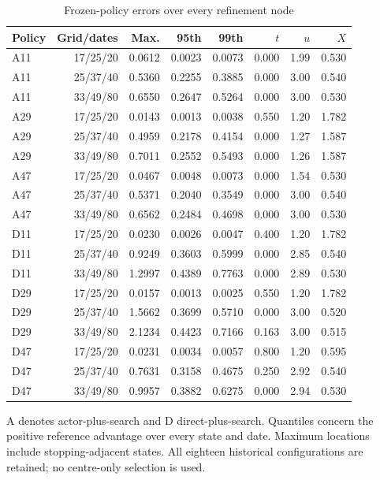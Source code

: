\begin{table}[htbp]
\centering\footnotesize\setlength{\tabcolsep}{4pt}
\caption{Frozen-policy errors over every refinement node}\label{tab:r9full}
\begin{tabular}{lrrrrrrr}
\toprule
Policy & Grid/dates & Max. & 95th & 99th & $t$ & $u$ & $X$ \\
\midrule
A11 & 17/25/20 & 0.0612 & 0.0023 & 0.0073 & 0.000 & 1.99 & 0.530 \\
A11 & 25/37/40 & 0.5360 & 0.2255 & 0.3885 & 0.000 & 3.00 & 0.540 \\
A11 & 33/49/80 & 0.6550 & 0.2647 & 0.5264 & 0.000 & 3.00 & 0.530 \\
A29 & 17/25/20 & 0.0143 & 0.0013 & 0.0038 & 0.550 & 1.20 & 1.782 \\
A29 & 25/37/40 & 0.4959 & 0.2178 & 0.4154 & 0.000 & 1.27 & 1.587 \\
A29 & 33/49/80 & 0.7011 & 0.2552 & 0.5493 & 0.000 & 1.26 & 1.587 \\
A47 & 17/25/20 & 0.0467 & 0.0048 & 0.0073 & 0.000 & 1.54 & 0.530 \\
A47 & 25/37/40 & 0.5371 & 0.2040 & 0.3549 & 0.000 & 3.00 & 0.540 \\
A47 & 33/49/80 & 0.6562 & 0.2484 & 0.4698 & 0.000 & 3.00 & 0.530 \\
D11 & 17/25/20 & 0.0230 & 0.0026 & 0.0047 & 0.400 & 1.20 & 1.782 \\
D11 & 25/37/40 & 0.9249 & 0.3603 & 0.5999 & 0.000 & 2.85 & 0.540 \\
D11 & 33/49/80 & 1.2997 & 0.4389 & 0.7763 & 0.000 & 2.89 & 0.530 \\
D29 & 17/25/20 & 0.0157 & 0.0013 & 0.0025 & 0.550 & 1.20 & 1.782 \\
D29 & 25/37/40 & 1.5662 & 0.3699 & 0.5710 & 0.000 & 3.00 & 0.520 \\
D29 & 33/49/80 & 2.1234 & 0.4423 & 0.7166 & 0.163 & 3.00 & 0.515 \\
D47 & 17/25/20 & 0.0231 & 0.0034 & 0.0057 & 0.800 & 1.20 & 0.595 \\
D47 & 25/37/40 & 0.7631 & 0.3158 & 0.4675 & 0.250 & 2.92 & 0.540 \\
D47 & 33/49/80 & 0.9957 & 0.3882 & 0.6275 & 0.000 & 2.94 & 0.530 \\
\bottomrule
\end{tabular}
\par\vspace{3pt}\begin{minipage}{0.97\linewidth}\footnotesize A denotes actor-plus-search and D direct-plus-search. Quantiles concern the positive reference advantage over every state and date. Maximum locations include stopping-adjacent states. All eighteen historical configurations are retained; no centre-only selection is used.\end{minipage}
\end{table}
